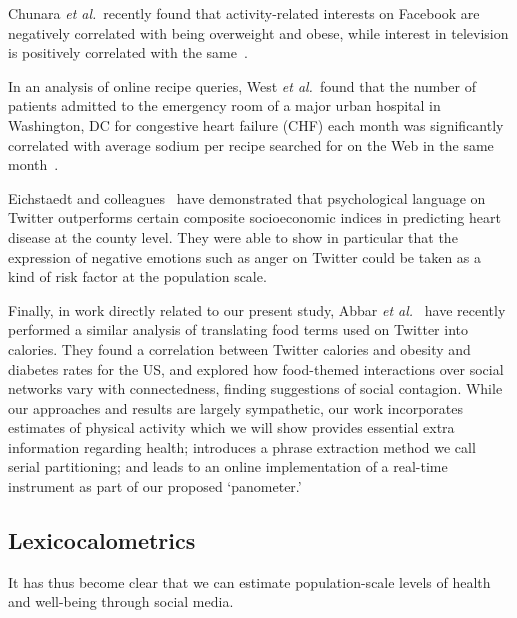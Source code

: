 \documentclass[10pt]{article}
\newcommand{\etal}{\textit{et al.}}
\begin{document}
Chunara \etal\ recently found that
activity-related interests on Facebook are negatively correlated with
being overweight and obese, while interest in television is positively
correlated with the same~\cite{chunara2013}.  

In an analysis of online recipe queries, West \etal\ found
that the number of patients admitted to the emergency room of a major
urban hospital in Washington, DC for congestive heart failure (CHF)
each month was significantly correlated with average sodium per recipe
searched for on the Web in the same month~\cite{west2013}.

Eichstaedt and colleagues~\cite{eichstaedt2015a} have demonstrated
that psychological language on Twitter outperforms certain composite 
socioeconomic indices in predicting heart disease at the county level.
They were able to show in particular that the expression
of negative emotions such as
anger on Twitter could be taken as a kind of risk factor at
the population scale.

Finally, in work directly related to our present study,
Abbar \etal~\cite{abbar2014a} have recently
performed a similar analysis 
of translating food terms used on Twitter into calories.
They found a correlation between
Twitter calories and obesity and diabetes rates for the US,
and explored how food-themed interactions over social networks vary
with connectedness, finding suggestions of social contagion.
While our approaches and results are largely sympathetic,
our work incorporates estimates of physical activity which we
will show provides essential extra information regarding health;
introduces a phrase extraction method we call serial partitioning;
and leads to an online
implementation of a real-time instrument as part of our
proposed `panometer.'

\subsection*{Lexicocalometrics}
\label{subsec:fluxwell.now}

It has thus become clear that we can estimate
population-scale levels of health and well-being through social media.
\end{document}
